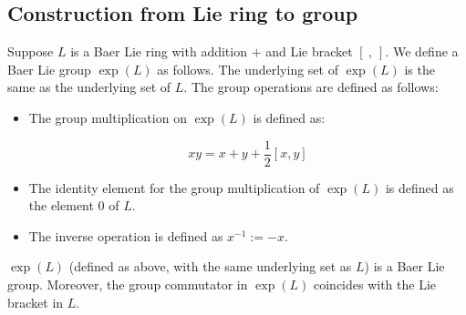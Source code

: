 \documentclass{ucetd}
\begin{document}
\subsection{Construction from Lie ring to group}\label{sec:baer-lie-ring-to-group}

Suppose $L$ is a Baer Lie ring with addition $+$ and Lie bracket $[
  \ , \ ]$. We define a Baer Lie group $\exp(L)$ as follows. The
underlying set of $\exp(L)$ is the same as the underlying set of
$L$. The group operations are defined as follows:

\begin{itemize}
\item The group multiplication on $\exp(L)$ is defined as:

  $$xy = x + y + \frac{1}{2}[x,y]$$
\item The identity element for the group multiplication of $\exp(L)$ is
  defined as the element $0$ of $L$.
\item The inverse operation is defined as $x^{-1} := -x$.
\end{itemize}

\begin{lemma}
  $\exp(L)$ (defined as above, with the same underlying set as $L$) is
  a Baer Lie group. Moreover, the group commutator in $\exp(L)$
  coincides with the Lie bracket in $L$.
\end{lemma}
\end{document}
